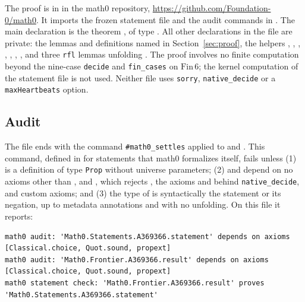\documentclass[11pt]{amsart}
\theoremstyle{plain}
\theoremstyle{definition}
\begin{document}
The proof is in  in the math0 repository, \url{https://github.com/Foundation-0/math0}. It imports the frozen statement file and the audit commands in . The main declaration is the theorem , of type . All other declarations in the file are private: the lemmas and definitions named in Section~\ref{sec:proof}, the helpers , , , , , , , and three \texttt{rfl} lemmas unfolding . The proof involves no finite computation beyond the nine-case \texttt{decide} and \texttt{fin\_cases} on $\mathrm{Fin}\,6$; the kernel computation  of the statement file is not used. Neither file uses \texttt{sorry}, \texttt{native\_decide} or a \texttt{maxHeartbeats} option.

\subsection*{Audit}
The file ends with the command \texttt{\#math0\_settles} applied to  and . This command, defined in  for statements that math0 formalizes itself, fails unless (1)  is a definition of type \texttt{Prop} without universe parameters; (2)  and  depend on no axioms other than ,  and , which rejects , the axioms  and  behind \texttt{native\_decide}, and custom axioms; and (3) the type of  is syntactically the statement or its negation, up to metadata annotations and with no unfolding. On this file it reports:
\begin{lstlisting}
math0 audit: 'Math0.Statements.A369366.statement' depends on axioms [Classical.choice, Quot.sound, propext]
math0 audit: 'Math0.Frontier.A369366.result' depends on axioms [Classical.choice, Quot.sound, propext]
math0 statement check: 'Math0.Frontier.A369366.result' proves 'Math0.Statements.A369366.statement'
\end{lstlisting}
\end{document}
